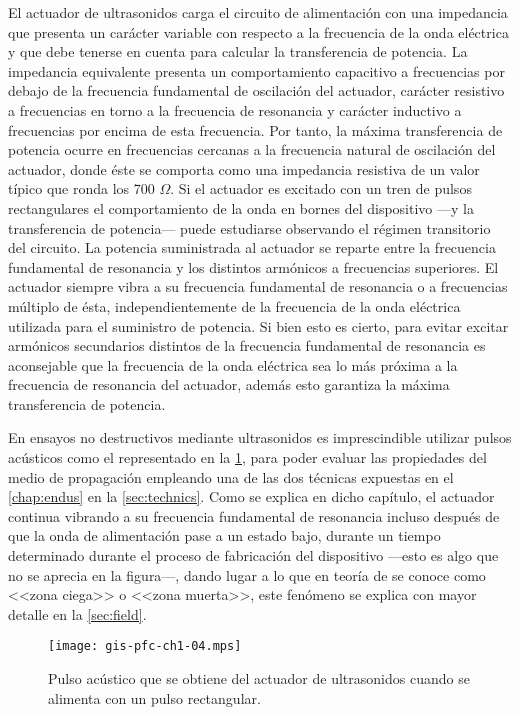 El actuador de ultrasonidos carga el circuito de alimentación con una
impedancia que presenta un carácter variable con respecto a la frecuencia
de la onda eléctrica y que debe tenerse en cuenta para calcular la
transferencia de potencia. La impedancia equivalente presenta un
comportamiento capacitivo a frecuencias por debajo de la frecuencia
fundamental de oscilación del actuador, carácter resistivo a frecuencias en
torno a la frecuencia de resonancia y carácter inductivo a frecuencias por
encima de esta frecuencia. Por tanto, la máxima transferencia de potencia
ocurre en frecuencias cercanas a la frecuencia natural de oscilación del
actuador, donde éste se comporta como una impedancia resistiva de un valor
típico que ronda los 700 $\Omega$. Si el actuador es excitado con un tren
de pulsos rectangulares el comportamiento de la onda en bornes del
dispositivo ---y la transferencia de potencia--- puede estudiarse
observando el régimen transitorio del circuito. La potencia suministrada al
actuador se reparte entre la frecuencia fundamental de resonancia y los
distintos armónicos a frecuencias superiores. El actuador siempre vibra a
su frecuencia fundamental de resonancia o a frecuencias múltiplo de ésta,
independientemente de la frecuencia de la onda eléctrica utilizada para el
suministro de potencia. Si bien esto es cierto, para evitar excitar
armónicos secundarios distintos de la frecuencia fundamental de resonancia
es aconsejable que la frecuencia de la onda eléctrica sea lo más próxima a
la frecuencia de resonancia del actuador, además esto garantiza la máxima
transferencia de potencia.

En ensayos no destructivos mediante ultrasonidos es imprescindible utilizar
pulsos acústicos como el representado en la \cref{fig:pulse}, para poder
evaluar las propiedades del medio de propagación empleando una de las dos
técnicas expuestas en el \cref{chap:endus} en la \cref{sec:technics}. Como
se explica en dicho capítulo, el actuador continua vibrando a su frecuencia
fundamental de resonancia incluso después de que la onda de alimentación
pase a un estado bajo, durante un tiempo determinado durante el proceso de
fabricación del dispositivo ---esto es algo que no se aprecia en la
figura---, dando lugar a lo que en teoría de  se conoce como
<<zona ciega>> o <<zona muerta>>, este fenómeno se explica con mayor
detalle en la \cref{sec:field}.

\begin{figure}
	\begin{center}
		\texttt{[image: gis-pfc-ch1-04.mps]}
	\end{center}
	\caption[Pulso acústico generado por el actuador de
	ultrasonidos]{Pulso acústico que se obtiene del actuador de
	ultrasonidos cuando se alimenta con un pulso rectangular.}
	\label{fig:pulse}
\end{figure}

